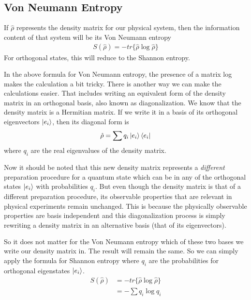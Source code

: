 \subsection{Von Neumann Entropy}
If $\hat{\rho}$ represents the density matrix for our physical system, then the information content of that system will be its Von Neumann entropy
\begin{align*}
S(\hat{\rho}) = - tr\{ \hat{\rho} \log \hat{\rho} \}
\end{align*}
For orthogonal states, this will reduce to the Shannon entropy.
\par In the above formula for Von Neumann entropy, the presence of a matrix log makes the calculation a bit tricky. There is another way we can make the calculations easier. That includes writing an equivalent form of the density matrix in an orthogonal basis, also known as diagonalization.
We know that the density matrix is a Hermitian matrix. If we write it in a basis of its orthogonal eigenvectors $\ket{e_i}$, then its diagonal form is
\begin{align*}
\hat{\rho} = \sum q_i \ket{e_i} \bra{e_i}
\end{align*}
where $q_i$ are the real eigenvalues of the density matrix.
\par Now it should be noted that this new density matrix represents a \textit{different} preparation procedure for a quantum state which can be in any of the orthogonal states $\ket{e_i}$ with probabilities $q_i$. But even though the density matrix is that of a different preparation procedure, its observable properties that are relevant in physical experiments remain unchanged. This is because the physically observable properties are basis independent and this diagonalization process is simply rewriting a density matrix in an alternative basis (that of its eigenvectors).
\par So it does not matter for the Von Neumann entropy which of these two bases we write our density matrix in. The result will remain the same. So we can simply apply the formula for Shannon entropy where $q_i$ are the probabilities for orthogonal eigenstates $\ket{e_i}$.
\begin{align*}
S(\hat{\rho}) &= - tr\{ \hat{\rho} \log \hat{\rho} \} \\
              &= - \sum q_i \log q_i
\end{align*}

